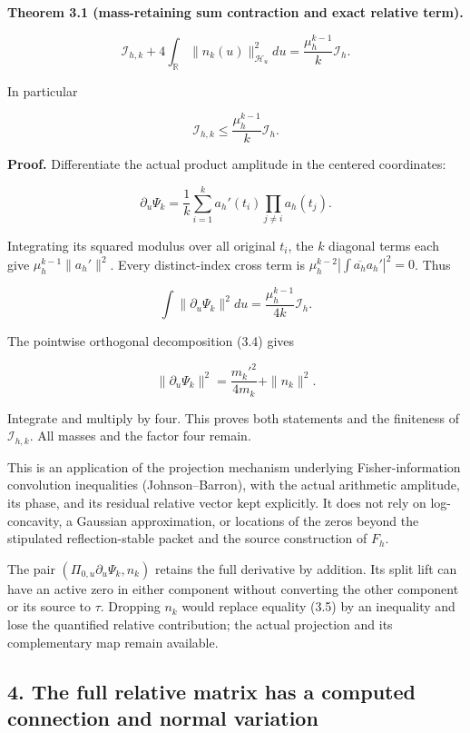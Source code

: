 \documentclass[
]{article}
\begin{document}
\textbf{Theorem 3.1 (mass-retaining sum contraction and exact relative
term).}

\[\boxed{\mathcal I_{h,k}+4\int_{\mathbb R}\|n_k(u)\|_{\mathscr H_u}^2du
=\frac{\mu_h^{k-1}}{k}\mathcal I_h.}\tag{3.5}\]

In particular

\[\boxed{\mathcal I_{h,k}\le\frac{\mu_h^{k-1}}{k}\mathcal I_h.}\tag{3.6}\]

\textbf{Proof.} Differentiate the actual product amplitude in the
centered coordinates:

\[\partial_u\Psi_k=\frac1k\sum_{i=1}^k a_h'(t_i)\prod_{j\ne i}a_h(t_j).\]

Integrating its squared modulus over all original \(t_i\), the \(k\)
diagonal terms each give \(\mu_h^{k-1}\|a_h'\|^2\). Every distinct-index
cross term is \(\mu_h^{k-2}|\int\overline{a_h}a_h'|^2=0\). Thus

\[\int\|\partial_u\Psi_k\|^2du=\frac{\mu_h^{k-1}}{4k}\mathcal I_h.\]

The pointwise orthogonal decomposition (3.4) gives

\[\|\partial_u\Psi_k\|^2=\frac{m_k'^2}{4m_k}+\|n_k\|^2.\]

Integrate and multiply by four. This proves both statements and the
finiteness of \(\mathcal I_{h,k}\). All masses and the factor four
remain.

This is an application of the projection mechanism underlying
Fisher-information convolution inequalities (Johnson--Barron), with the
actual arithmetic amplitude, its phase, and its residual relative vector
kept explicitly. It does not rely on log-concavity, a Gaussian
approximation, or locations of the zeros beyond the stipulated
reflection-stable packet and the source construction of \(F_h\).

The pair \((\Pi_{0,u}\partial_u\Psi_k,n_k)\) retains the full derivative
by addition. Its split lift can have an active zero in either component
without converting the other component or its source to \(\tau\).
Dropping \(n_k\) would replace equality (3.5) by an inequality and lose
the quantified relative contribution; the actual projection and its
complementary map remain available.

\subsection{4. The full relative matrix has a computed connection and
normal
variation}\label{the-full-relative-matrix-has-a-computed-connection-and-normal-variation}
\end{document}
